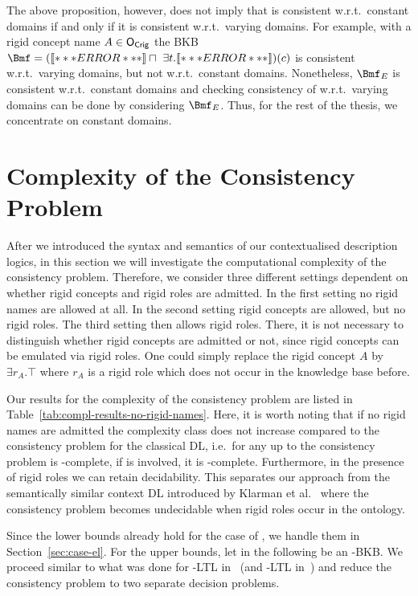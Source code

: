 \noindent
The above proposition, however, does not imply that \Bmf is consistent w.r.t.\ constant domains if
and only if it is consistent w.r.t.\ varying domains. For example, with a rigid concept name
$A\in\mathsf{O_{Crig}}$ the BKB
$\Bmf = (\oax{\top \sqsubseteq A} \sqcap\ \exists t.\oax{A \sqsubseteq \exists r.\lnot A})(c)$ is consistent w.r.t.\ varying domains, but not w.r.t.\ constant domains. Nonetheless,
$\Bmf_{E}$ is consistent w.r.t.\ constant domains and checking consistency of \Bmf w.r.t.\ varying
domains can be done by considering $\Bmf_{E}$.  Thus, for the rest of the thesis, we concentrate on
constant domains.

\section{Complexity of the Consistency Problem}
\label{sec:complexity-consis-problem}

After we introduced the syntax and semantics of our contextualised description logics, in this
section we will investigate the computational complexity of the consistency problem.  Therefore, we
consider three different settings dependent on whether rigid concepts and rigid roles are admitted.
In the first setting no rigid names are allowed at all.  In the second setting rigid concepts are
allowed, but no rigid roles.  The third setting then allows rigid roles. There, it is not necessary
to distinguish whether rigid concepts are admitted or not, since rigid concepts can be emulated via
rigid roles. One could simply replace the rigid concept $A$ by $\exists r_{A}.\top$ where $r_{A}$ is
a rigid role which does not occur in the knowledge base before.

Our results for the complexity of the consistency problem are listed in
Table~\ref{tab:compl-results-no-rigid-names}. Here, it is worth noting that if no rigid names are
admitted the complexity class does not increase compared to the consistency problem for the
classical DL, i.e.\ for any \LMLO up to \SHOQSHOQ the consistency problem is \ExpTime-complete, if
\SHOIQ is involved, it is \NExpTime-complete. Furthermore, in the presence of rigid roles we can
retain decidability.  This separates our approach from the semantically similar context DL
introduced by Klarman et al.~\cite{KG-JELIA10,KG16} where the consistency problem becomes
undecidable when rigid roles occur in the ontology.

Since the lower bounds already hold for the case of \EL, we handle them in Section~\ref{sec:case-el}.
%
For the upper bounds, let in the following \BB be an \LMLO-BKB.  We proceed
similar to what was done for \ALC-LTL in~\cite{BaGL-KR08,BaGL-ToCL12} (and
\SHOQ-LTL in~\cite{Lip-PhD14}) and reduce the consistency problem to two separate
decision problems.

